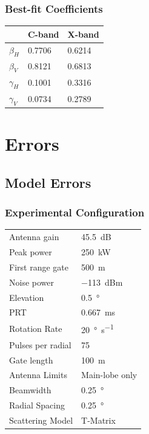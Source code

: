 \documentclass[red]{beamer}
\begin{document}
\begin{frame}
	\frametitle{Best-fit Coefficients}
    \begin{center}
	    \begin{tabular}{ | l | l | l |}
	        \hline
	        & \textbf{C-band} & \textbf{X-band}\\
	        \hline\hline
	        $\beta_H$ &  \num{0.7706} & \num{0.6214} \\
	        $\beta_V$ &  \num{0.8121} & \num{0.6813} \\
	        $\gamma_H$ & \num{0.1001} & \num{0.3316} \\
	        $\gamma_V$ & \num{0.0734} & \num{0.2789} \\
	        \hline
	    \end{tabular}
	\end{center}
\end{frame}

\section{Errors}
\subsection{Model Errors}
\begin{frame}
	\frametitle{Experimental Configuration}
	\begin{center}
	    \begin{tabular}{ | l | l | }
	        \hline
	        Antenna gain & \SI{45.5}{dB} \\
	        Peak power & \SI{250}{\kilo\watt} \\
	        First range gate & \SI{500}{\meter} \\
	        Noise power & \SI{-113}{dBm} \\
	        Elevation & \SI{0.5}{\degree} \\
	        PRT & \SI{0.667}{\milli\second} \\
	        Rotation Rate & \SI{20}{\degree\per\second} \\
	        Pulses per radial & \num{75} \\
	        Gate length & \SI{100}{\meter} \\
	        Antenna Limits & Main-lobe only \\
			Beamwidth & \SI{0.25}{\degree} \\
			Radial Spacing & \SI{0.25}{\degree} \\
			Scattering Model & T-Matrix \\
			\hline
	    \end{tabular}
	\end{center}
\end{frame}
\end{document}
